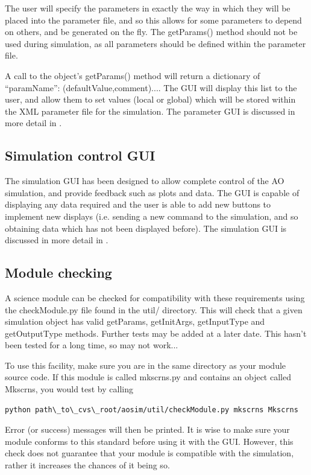\documentclass{article}
\begin{document}
The user will specify the parameters in exactly the way in which they
will be placed into the parameter file, and so this allows for some
parameters to depend on others, and be generated on the fly.  The
getParams() method should not be used during simulation, as all
parameters should be defined within the parameter file.

A call to the object's getParams() method will return a dictionary of
{``paramName'': (defaultValue,comment)...}.  The GUI will
display this list to the user, and allow them to set values (local or
global) which will be stored within the XML parameter file for the
simulation.  The parameter GUI is discussed in more detail in
\citet{simparamgui}. 


\subsection{Simulation control GUI}
The simulation GUI has been designed to allow complete control of the
AO simulation, and provide feedback such as plots and data.  The GUI
is capable of displaying any data required and the user is able to add
new buttons to implement new displays (i.e. sending a new command to
the simulation, and so obtaining data which has not been displayed
before).  The simulation GUI is discussed in more detail in
\citet{simctrlgui}.


\subsection{Module checking}
A science module can be checked for compatibility with these
requirements using the checkModule.py file found in the
util/ directory.  This will check that a given simulation object has
valid getParams, getInitArgs, getInputType and getOutputType
methods.  Further tests may be added at a later date.   This hasn't
been tested for a long time, so may not work...

To use this facility, make sure you are in the same directory as your
module source code.  If this module is called mkscrns.py and contains
an object called Mkscrns, you would test by calling 
\begin{verbatim}
python path\_to\_cvs\_root/aosim/util/checkModule.py mkscrns Mkscrns
\end{verbatim}
Error (or success) messages will then be printed.
It is wise to make sure your module conforms to this standard before
using it with the GUI.  However, this check does not guarantee that
your module is compatible with the simulation, rather it increases the
chances of it being so.
\end{document}
